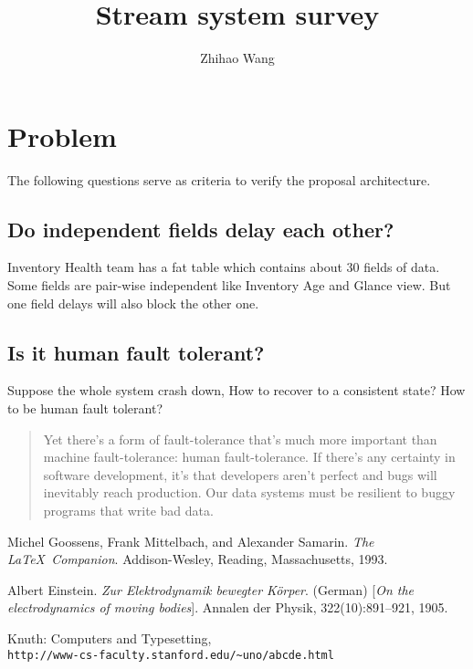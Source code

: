 \documentclass[12pt]{article}
\title{Stream system survey}
\author{Zhihao Wang}
\begin{document}
\maketitle

\section{Problem}
The following questions serve as criteria to verify the proposal architecture. 

\subsection{Do independent fields delay each other?}
Inventory Health team has a fat table which contains about 30 fields of data. Some fields are pair-wise independent like Inventory Age and Glance view. But one field delays will also block the other one.

\subsection{Is it human fault tolerant?}
Suppose the whole system crash down, How to recover to a consistent state? How to be human fault tolerant?
\begin{quote}
Yet there's a form of fault-tolerance that's much more important than machine fault-tolerance: human fault-tolerance. If there's any certainty in software development, it's that developers aren't perfect and bugs will inevitably reach production. Our data systems must be resilient to buggy programs that write bad data.\cite{latexcompanion}
\end{quote}

\begin{thebibliography}{9}
Michel Goossens, Frank Mittelbach, and Alexander Samarin.
\textit{The \LaTeX\ Companion}.
Addison-Wesley, Reading, Massachusetts, 1993.

Albert Einstein.
\textit{Zur Elektrodynamik bewegter K{\"o}rper}. (German)
[\textit{On the electrodynamics of moving bodies}].
Annalen der Physik, 322(10):891–921, 1905.

Knuth: Computers and Typesetting,
\\\texttt{http://www-cs-faculty.stanford.edu/\~{}uno/abcde.html}
\end{thebibliography}
\end{document}

